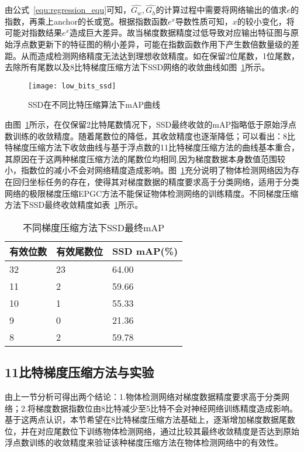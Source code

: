 由公式~\ref{equ:regression_equ}可知，$\hat{G_{w}}, \hat{G_{h}}$的计算过程中需要将网络输出的值求$e$的指数，再乘上anchor的长或宽。根据指数函数$e^{x}$导数性质可知，$x$的较小变化，将可能对指数结果$e^{x}$造成巨大差异。故当梯度数据精度过低导致对应输出特征图与原始浮点数更新下的特征图的稍小差异，可能在指数函数作用下产生数倍数量级的差距。从而造成检测网络精度无法达到理想收敛精度。如在保留2位尾数，1位尾数，去除所有尾数以及8比特梯度压缩方法下SSD网络的收敛曲线如图~\ref{fig:low_bits_ssd}所示。
\begin{figure}[htp]
\centering
\texttt{[image: low\_bits\_ssd]}
\caption{SSD在不同比特压缩算法下mAP曲线}
\label{fig:low_bits_ssd}
\end{figure}

由图~\ref{fig:low_bits_ssd}所示，在仅保留2比特尾数情况下，SSD最终收敛的mAP指略低于原始浮点数训练的收敛精度。随着尾数位的降低，其收敛精度也逐渐降低；可以看出：8比特梯度压缩方法下收敛曲线与基于浮点数的11比特梯度压缩方法的曲线基本重合，其原因在于这两种梯度压缩方法的尾数位均相同,因为梯度数据本身数值范围较小，指数位的减小不会对网络精度造成影响。图~\ref{fig:low_bits_ssd}充分说明了物体检测网络因为存在回归坐标任务的存在，使得其对梯度数据的精度要求高于分类网络，适用于分类网络的极限梯度压缩EPGC方法不能保证物体检测网络的训练精度。不同梯度压缩方法下SSD最终收敛精度如表~\ref{tab:ssd_accs}所示。
\begin{table}[htb]
\centering
\noindent\begin{minipage}{0.6\textwidth}
\centering
\caption{不同梯度压缩方法下SSD最终mAP}
\label{tab:ssd_accs}
\begin{tabular}{p{2cm}p{2cm}p{2.5cm}}
\toprule[1.5pt]
有效位数 & 有效尾数位 & SSD mAP(\%) \\\midrule[1pt]
32 & 23 & 64.00 \\
11 & 2 & 59.66 \\
10 & 1 & 55.33 \\
9 & 0 & 21.36 \\
8 & 2 & 59.78 \\
\midrule[1pt]
\end{tabular}
\end{minipage}
\end{table}

\subsection{11比特梯度压缩方法与实验}
由上一节分析可得出两个结论：1.物体检测网络对梯度数据精度要求高于分类网络；2.将梯度数据指数位由8比特减少至5比特不会对神经网络训练精度造成影响。基于这两点认识，本节希望在8比特梯度压缩方法基础上，逐渐增加梯度数据尾数位，并在对应尾数位下训练物体检测网络，通过比较其最终收敛精度是否达到原始浮点数训练的收敛精度来验证该种梯度压缩方法在物体检测网络中的有效性。

